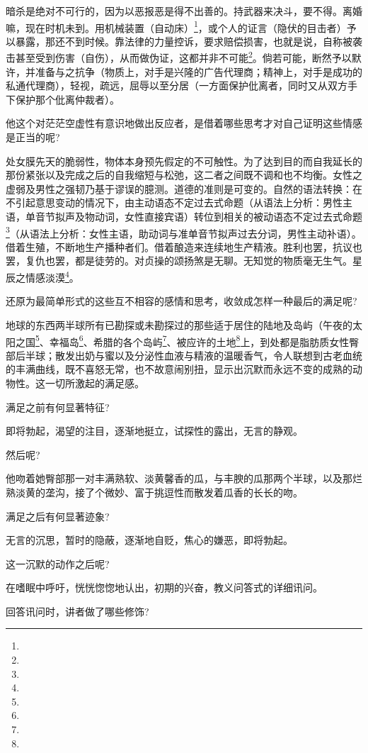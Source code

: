 \par 暗杀是绝对不可行的，因为以恶报恶是得不出善的。持武器来决斗，要不得。离婚嘛，现在时机未到。用机械装置（自动床）\footnote{}，或个人的证言（隐伏的目击者）予以暴露，那还不到时候。靠法律的力量控诉，要求赔偿损害，也就是说，自称被袭击甚至受到伤害（自伤），从而做伪证，这都并非不可能\footnote{}。倘若可能，断然予以默许，并准备与之抗争（物质上，对手是兴隆的广告代理商；精神上，对手是成功的私通代理商），轻视，疏远，屈辱以至分居（一方面保护仳离者，同时又从双方手下保护那个仳离仲裁者）。
\par 他这个对茫茫空虚性有意识地做出反应者，是借着哪些思考才对自己证明这些情感是正当的呢?
\par 处女膜先天的脆弱性，物体本身预先假定的不可触性。为了达到目的而自我延长的那份紧张以及完成之后的自我缩短与松弛，这二者之间既不调和也不均衡。女性之虚弱及男性之强韧乃基于谬误的臆测。道德的准则是可变的。自然的语法转换：在不引起意思变动的情况下，由主动语态不定过去式命题（从语法上分析：男性主语，单音节拟声及物动词，女性直接宾语）转位到相关的被动语态不定过去式命题\footnote{}（从语法上分析：女性主语，助动词与准单音节拟声过去分词，男性主动补语）。借着生殖，不断地生产播种者们。借着酿造来连续地生产精液。胜利也罢，抗议也罢，复仇也罢，都是徒劳的。对贞操的颂扬煞是无聊。无知觉的物质毫无生气。星辰之情感淡漠\footnote{}。
\par 还原为最简单形式的这些互不相容的感情和思考，收敛成怎样一种最后的满足呢?
\par 地球的东西两半球所有已勘探或未勘探过的那些适于居住的陆地及岛屿（午夜的太阳之国\footnote{}、幸福岛\footnote{}、希腊的各个岛屿\footnote{}、被应许的土地\footnote{}上，到处都是脂肪质女性臀部后半球；散发出奶与蜜以及分泌性血液与精液的温暖香气，令人联想到古老血统的丰满曲线，既不喜怒无常，也不故意闹别扭，显示出沉默而永远不变的成熟的动物性。这一切所激起的满足感。
\par 满足之前有何显著特征?
\par 即将勃起，渴望的注目，逐渐地挺立，试探性的露出，无言的静观。
\par 然后呢?
\par 他吻着她臀部那一对丰满熟软、淡黄馨香的瓜，与丰腴的瓜那两个半球，以及那烂熟淡黄的垄沟，接了个微妙、富于挑逗性而散发着瓜香的长长的吻。
\par 满足之后有何显著迹象?
\par 无言的沉思，暂时的隐蔽，逐渐地自贬，焦心的嫌恶，即将勃起。
\par 这一沉默的动作之后呢?
\par 在嗜眠中呼吁，恍恍惚惚地认出，初期的兴奋，教义问答式的详细讯问。
\par 回答讯问时，讲者做了哪些修饰?
